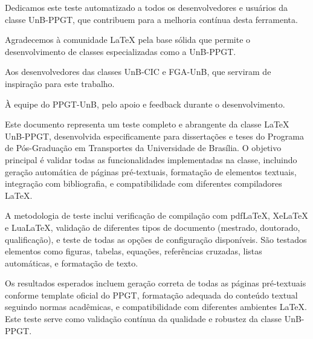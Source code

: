 \documentclass[mestrado,onehalfspacing,12pt,hyperref]{UnB-PPGT}
\begin{document}
\pretextual

\capa
\folhaderosto
\folhadeaprovacao
\fichacatalografica

\begin{dedicatoria}
Dedicamos este teste automatizado a todos os desenvolvedores e usuários da classe UnB-PPGT, que contribuem para a melhoria contínua desta ferramenta.
\end{dedicatoria}

\begin{agradecimentos}
Agradecemos à comunidade LaTeX pela base sólida que permite o desenvolvimento de classes especializadas como a UnB-PPGT.

Aos desenvolvedores das classes UnB-CIC e FGA-UnB, que serviram de inspiração para este trabalho.

À equipe do PPGT-UnB, pelo apoio e feedback durante o desenvolvimento.
\end{agradecimentos}

\begin{resumo}
Este documento representa um teste completo e abrangente da classe LaTeX UnB-PPGT, desenvolvida especificamente para dissertações e teses do Programa de Pós-Graduação em Transportes da Universidade de Brasília. O objetivo principal é validar todas as funcionalidades implementadas na classe, incluindo geração automática de páginas pré-textuais, formatação de elementos textuais, integração com bibliografia, e compatibilidade com diferentes compiladores LaTeX.

A metodologia de teste inclui verificação de compilação com pdfLaTeX, XeLaTeX e LuaLaTeX, validação de diferentes tipos de documento (mestrado, doutorado, qualificação), e teste de todas as opções de configuração disponíveis. São testados elementos como figuras, tabelas, equações, referências cruzadas, listas automáticas, e formatação de texto.

Os resultados esperados incluem geração correta de todas as páginas pré-textuais conforme template oficial do PPGT, formatação adequada do conteúdo textual seguindo normas acadêmicas, e compatibilidade com diferentes ambientes LaTeX. Este teste serve como validação contínua da qualidade e robustez da classe UnB-PPGT.
\end{resumo}
\end{document}
